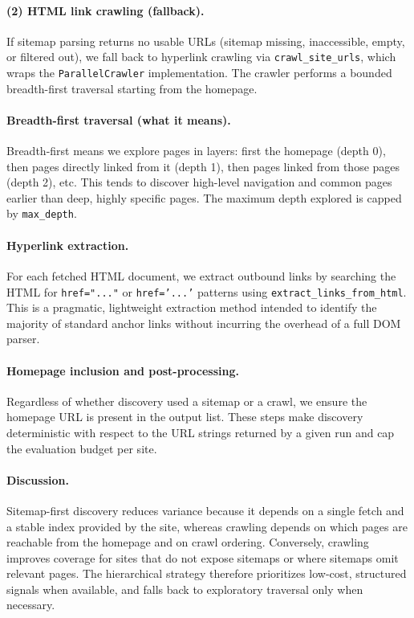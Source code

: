 \paragraph{(2) HTML link crawling (fallback).}
If sitemap parsing returns no usable URLs (sitemap missing, inaccessible, empty, or filtered out), we fall back to hyperlink crawling via \texttt{crawl\_site\_urls}, which wraps the \texttt{ParallelCrawler} implementation. The crawler performs a bounded breadth-first traversal starting from the homepage.

\paragraph{Breadth-first traversal (what it means).}
Breadth-first means we explore pages in layers: first the homepage (depth 0), then pages directly linked from it (depth 1), then pages linked from those pages (depth 2), etc. This tends to discover high-level navigation and common pages earlier than deep, highly specific pages. The maximum depth explored is capped by \texttt{max\_depth}.

\paragraph{Hyperlink extraction.}
For each fetched HTML document, we extract outbound links by searching the HTML for \texttt{href="..."} or \texttt{href='...'} patterns using \texttt{extract\_links\_from\_html}. This is a pragmatic, lightweight extraction method intended to identify the majority of standard anchor links without incurring the overhead of a full DOM parser.


\paragraph{Homepage inclusion and post-processing.}
Regardless of whether discovery used a sitemap or a crawl, we ensure the homepage URL is present in the output list.
These steps make discovery deterministic with respect to the URL strings returned by a given run and cap the evaluation budget per site.

\paragraph{Discussion.}
Sitemap-first discovery reduces variance because it depends on a single fetch and a stable index provided by the site, whereas crawling depends on which pages are reachable from the homepage and on crawl ordering. Conversely, crawling improves coverage for sites that do not expose sitemaps or where sitemaps omit relevant pages. The hierarchical strategy therefore prioritizes low-cost, structured signals when available, and falls back to exploratory traversal only when necessary.


